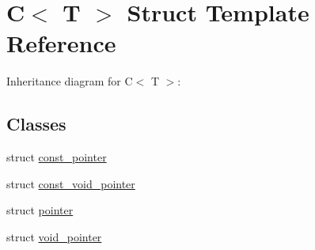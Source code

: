 \hypertarget{struct_c}{}\section{C$<$ T $>$ Struct Template Reference}
\label{struct_c}


Inheritance diagram for C$<$ T $>$\+:
\subsection*{Classes}
\begin{DoxyCompactItemize}
\item 
struct \mbox{\hyperlink{struct_c_1_1const__pointer}{const\+\_\+pointer}}
\item 
struct \mbox{\hyperlink{struct_c_1_1const__void__pointer}{const\+\_\+void\+\_\+pointer}}
\item 
struct \mbox{\hyperlink{struct_c_1_1pointer}{pointer}}
\item 
struct \mbox{\hyperlink{struct_c_1_1void__pointer}{void\+\_\+pointer}}
\end{DoxyCompactItemize}
